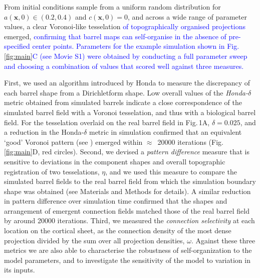 \documentclass[9pt,lineno]{elife}
\newcommand{\cmnt}[1]{\textcolor{blue}{#1}}
\newcommand{\MPtwo}[1]{\textcolor{revblue}{#1}}
\newcommand{\metrics}[1]{\textcolor{revred}{#1}}
\newcommand{\mb}[1]{\mathbf{#1}}
\begin{document}
From initial conditions sample from a uniform random distribution for
$a(\mb{x},0)\in(0.2,0.4)$ and $c(\mb{x},0)=0$, and across a wide range of
parameter values,
a clear Voronoi-like tesselation \cmnt{of topographically organised
  projections} emerged, \cmnt{confirming that barrel maps can self-organise in
  the absence of pre-specified center points. Parameters for the example
  simulation shown in Fig.\,\ref{fig:main}C (see Movie S1) were obtained by
  conducting a full parameter sweep and choosing a combination of values that
  scored well against three measures.}

\metrics{First, we used an algorithm introduced by Honda to measure the
  discrepancy of each barrel shape from a Dirichletform shape. Low
  overall values of the \emph{Honda-}$\delta$ metric obtained from simulated
  barrels indicate a close correspondence of the simulated barrel field with a
  Voronoi tesselation, and thus with a biological barrel field. For the
  tesselation overlaid on the real barrel field in Fig.\,1A, $\delta=0.025$,
  and a reduction in the Honda-$\delta$ metric in simulation
  confirmed that an equivalent `good' Voronoi pattern} (see
    \citealp{senft_mouse_1991}) \metrics{emerged within $\approx$~20000
  iterations (Fig.\,\ref{fig:main}D, red circles). Second, we devised a
  \emph{pattern difference} measure that is sensitive to deviations in the
  component shapes and overall topographic registration of two tesselations,
  $\eta$, and we used this measure to compare the simulated barrel fields to
  the real barrel field from which the simulation boundary shape was obtained
  (see Materials and Methods for details). A similar reduction in pattern
  difference over simulation time confirmed that the shapes and arrangement of
  emergent connection fields matched those of the real barrel field by around
  20000 iterations. Third, we measured the \emph{connection selectivity} at
  each location on the cortical sheet, as the connection density of the most
  dense projection divided by the sum over all projection densities, $\omega$.}
%
\metrics{Against these three metrics we are also able to characterise the
  robustness of self-organization to the model parameters, and to investigate
  the sensitivity of the model to variation in its inputs.}
\end{document}
